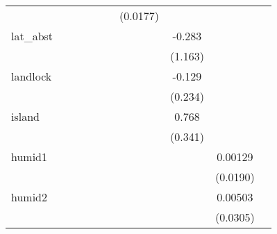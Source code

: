 {\begin{tabular}{l*{9}{c}}
            &                     &                     &                     &                     &                     &    (0.0177)         &                     &                     &                     \\
[1em]
lat\_abst    &                     &                     &                     &                     &                     &                     &      -0.283         &                     &                     \\
            &                     &                     &                     &                     &                     &                     &     (1.163)         &                     &                     \\
[1em]
landlock    &                     &                     &                     &                     &                     &                     &      -0.129         &                     &                     \\
            &                     &                     &                     &                     &                     &                     &     (0.234)         &                     &                     \\
[1em]
island      &                     &                     &                     &                     &                     &                     &       0.768\sym{**} &                     &                     \\
            &                     &                     &                     &                     &                     &                     &     (0.341)         &                     &                     \\
[1em]
humid1      &                     &                     &                     &                     &                     &                     &                     &     0.00129         &                     \\
            &                     &                     &                     &                     &                     &                     &                     &    (0.0190)         &                     \\
[1em]
humid2      &                     &                     &                     &                     &                     &                     &                     &     0.00503         &                     \\
            &                     &                     &                     &                     &                     &                     &                     &    (0.0305)         &                     \\

\end{tabular}}
